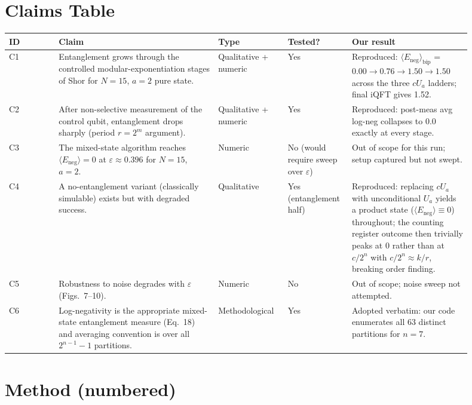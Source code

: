 \documentclass[11pt]{article}
\begin{document}
\section{Claims Table}
\begin{center}
\begin{longtable}{p{0.10\linewidth} p{0.32\linewidth} p{0.14\linewidth} p{0.10\linewidth} p{0.24\linewidth}}
\toprule
\textbf{ID} & \textbf{Claim} & \textbf{Type} & \textbf{Tested?} & \textbf{Our result} \\
\midrule
C1 & Entanglement grows through the controlled modular-exponentiation stages of Shor for $N=15$, $a=2$ pure state. & Qualitative + numeric & Yes & Reproduced: $\langle E_{\mathrm{neg}}\rangle_{\text{bip}}$ = $0.00 \to 0.76 \to 1.50 \to 1.50$ across the three $cU_a$ ladders; final iQFT gives 1.52. \\
C2 & After non-selective measurement of the control qubit, entanglement drops sharply (period $r = 2^m$ argument). & Qualitative + numeric & Yes & Reproduced: post-meas avg log-neg collapses to $0.0$ exactly at every stage. \\
C3 & The mixed-state algorithm reaches $\langle E_{\mathrm{neg}}\rangle = 0$ at $\varepsilon \approx 0.396$ for $N=15$, $a=2$. & Numeric & No (would require sweep over $\varepsilon$) & Out of scope for this run; setup captured but not swept. \\
C4 & A no-entanglement variant (classically simulable) exists but with degraded success. & Qualitative & Yes (entanglement half) & Reproduced: replacing $cU_a$ with unconditional $U_a$ yields a product state ($\langle E_{\mathrm{neg}}\rangle \equiv 0$) throughout; the counting register outcome then trivially peaks at 0 rather than at $c/2^n$ with $c/2^n \approx k/r$, breaking order finding. \\
C5 & Robustness to noise degrades with $\varepsilon$ (Figs.~7--10). & Numeric & No & Out of scope; noise sweep not attempted. \\
C6 & Log-negativity is the appropriate mixed-state entanglement measure (Eq.~18) and averaging convention is over all $2^{n-1}-1$ partitions. & Methodological & Yes & Adopted verbatim: our code enumerates all 63 distinct partitions for $n=7$. \\
\bottomrule
\end{longtable}
\end{center}

\section{Method (numbered)}
\end{document}
